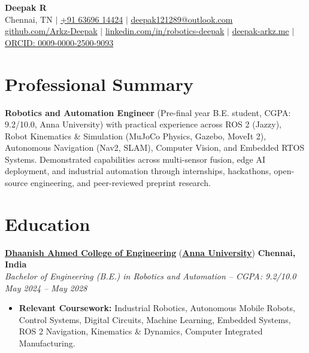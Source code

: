\documentclass[letterpaper,10pt]{article}
\begin{document}
\begin{center}
    {\LARGE \textbf{Deepak R}} \\ \vspace{3pt}
    \small Chennai, TN $|$ \href{tel:+916369614424}{+91 63696 14424} $|$ \href{mailto:deepak121289@outlook.com}{deepak121289@outlook.com} \\ \vspace{2pt}
    \href{https://github.com/Arkz-Deepak}{github.com/Arkz-Deepak} $|$ 
    \href{https://linkedin.com/in/robotics-deepak}{linkedin.com/in/robotics-deepak} $|$ 
    \href{https://deepak-arkz.me}{deepak-arkz.me} $|$
    \href{https://orcid.org/0009-0000-2500-9093}{ORCID: 0009-0000-2500-9093}
\end{center}
\vspace{-6pt}

\section{Professional Summary}
\small{\textbf{Robotics and Automation Engineer} (Pre-final year B.E. student, CGPA: 9.2/10.0, Anna University) with practical experience across ROS 2 (Jazzy), Robot Kinematics \& Simulation (MuJoCo Physics, Gazebo, MoveIt 2), Autonomous Navigation (Nav2, SLAM), Computer Vision, and Embedded RTOS Systems. Demonstrated capabilities across multi-sensor fusion, edge AI deployment, and industrial automation through internships, hackathons, open-source engineering, and peer-reviewed preprint research.}

\section{Education}
\noindent
\href{https://dhaanish.org}{\textbf{Dhaanish Ahmed College of Engineering}} (\href{https://www.annauniv.edu}{\textbf{Anna University}}) \hfill \textbf{Chennai, India} \\
\textit{Bachelor of Engineering (B.E.) in Robotics and Automation -- CGPA: 9.2/10.0} \hfill \textit{May 2024 -- May 2028} \\
\begin{itemize}
    \item \textbf{Relevant Coursework:} Industrial Robotics, Autonomous Mobile Robots, Control Systems, Digital Circuits, Machine Learning, Embedded Systems, ROS 2 Navigation, Kinematics \& Dynamics, Computer Integrated Manufacturing.
\end{itemize}
\end{document}
